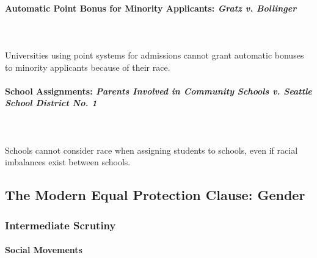 \paragraph{Automatic Point Bonus for Minority Applicants: \emph{Gratz v. 
Bollinger}}
~\\\\
Universities using point systems for admissions cannot grant automatic bonuses 
to minority applicants because of their race.

% 
 
\paragraph{School Assignments: \emph{Parents Involved in Community Schools v. Seattle School 
District No. 1}}
~\\\\
Schools cannot consider race when assigning students to schools, even if 
racial imbalances exist between schools.

% 
% 
 
\subsection{The Modern Equal Protection Clause: Gender}

\subsubsection{Intermediate Scrutiny}

\paragraph{Social Movements}

